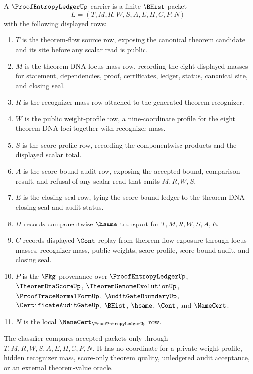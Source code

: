 \begin{definition}
\label{def:proof-entropy-ledger-carrier}
A $\ProofEntropyLedgerUp$ carrier is a finite $\BHist$ packet
$$
L=(T,M,R,W,S,A,E,H,C,P,N)
$$
with the following displayed rows:
\begin{enumerate}
\item $T$ is the theorem-flow source row, exposing the canonical theorem candidate and its site before any scalar read is public.
\item $M$ is the theorem-DNA locus-mass row, recording the eight displayed masses for statement, dependencies, proof, certificates, ledger, status, canonical site, and closing seal.
\item $R$ is the recognizer-mass row attached to the generated theorem recognizer.
\item $W$ is the public weight-profile row, a nine-coordinate profile for the eight theorem-DNA loci together with recognizer mass.
\item $S$ is the score-profile row, recording the componentwise products and the displayed scalar total.
\item $A$ is the score-bound audit row, exposing the accepted bound, comparison result, and refusal of any scalar read that omits $M,R,W,S$.
\item $E$ is the closing seal row, tying the score-bound ledger to the theorem-DNA closing seal and audit status.
\item $H$ records componentwise $\hsame$ transport for $T,M,R,W,S,A,E$.
\item $C$ records displayed $\Cont$ replay from theorem-flow exposure through locus masses, recognizer mass, public weights, score profile, score-bound audit, and closing seal.
\item $P$ is the $\Pkg$ provenance over $\ProofEntropyLedgerUp$, $\TheoremDnaScoreUp$, $\TheoremGenomeEvolutionUp$, $\ProofTraceNormalFormUp$, $\AuditGateBoundaryUp$, $\CertificateAuditGateUp$, $\BHist$, $\hsame$, $\Cont$, and $\NameCert$.
\item $N$ is the local $\NameCert_{\ProofEntropyLedgerUp}$ row.
\end{enumerate}
The classifier compares accepted packets only through $T,M,R,W,S,A,E,H,C,P,N$. It has no coordinate for a private weight profile, hidden recognizer mass, score-only theorem quality, unledgered audit acceptance, or an external theorem-value oracle.
\end{definition}

